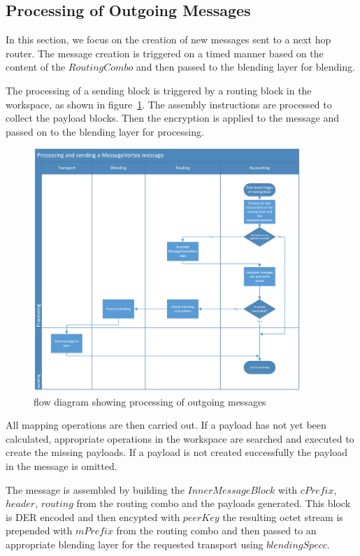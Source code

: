 \subsection{Processing of Outgoing Messages\label{sec:processingOutgoingMessages}}
In this section, we focus on the creation of new messages sent to a next hop router. The message creation is triggered on a timed manner based on the content of the $RoutingCombo$ and then passed to the blending layer for blending.

The processing of a sending block is triggered by a routing block in the workspace, as shown in figure~\ref{fig:msgSendProcessing}. The assembly instructions are processed to collect the payload blocks. Then the encryption is applied to the message and passed on to the blending layer for processing.

\begin{figure}[ht]
	\centering
	\includegraphics[width=0.90\textwidth]{inc/flowchart_message_sending}
	\caption{flow diagram showing processing of outgoing messages}
	\label{fig:msgSendProcessing}
\end{figure}

All mapping operations are then carried out. If a payload has not yet been calculated, appropriate operations in the workspace are searched and executed to create the missing payloads. If a payload is not created successfully the payload in the message is omitted. 

The message is assembled by building the $InnerMessageBlock$ with $cPrefix$, $header$, $routing$ from the routing combo and the payloads generated. This block is DER encoded and then encypted with $peerKey$ the resulting octet stream is prepended with $mPrefix$ from the routing combo and then passed to an appropriate blending layer for the requested transport using $blendingSpecc$.

